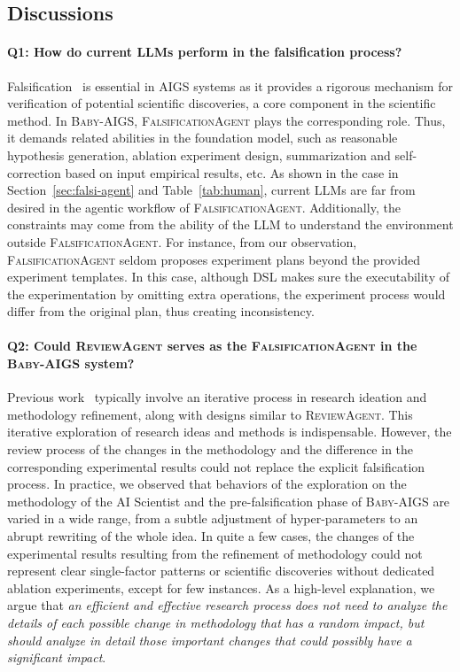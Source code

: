 \documentclass{article} %
\newcommand{\AIGS}{AIGS\xspace}
\newcommand{\AIGSSys}{\textsc{Baby-AIGS}\xspace}
\newcommand{\ReviewAgent}{\textsc{ReviewAgent}\xspace}
\newcommand{\FalsificationAgent}{\textsc{FalsificationAgent}\xspace}
\newcommand{\DSL}{\textsc{DSL}\xspace}
\begin{document}
\subsection{Discussions}\label{sec:exp-abl}

\paragraph{\textbf{Q1: How do current LLMs perform in the falsification process?}}

Falsification~\citep{Popper1935-POPTLO-7} is essential in \AIGS systems as it provides a rigorous mechanism for verification of potential scientific discoveries, a core component in the scientific method. In \AIGSSys, \FalsificationAgent plays the corresponding role. Thus, it demands related abilities in the foundation model, such as reasonable hypothesis generation, ablation experiment design, summarization and self-correction based on input empirical results, etc. As shown in the case in Section~\ref{sec:falsi-agent} and Table~\ref{tab:human}, current LLMs are far from desired in the agentic workflow of \FalsificationAgent. Additionally, the constraints may come from the ability of the LLM to understand the environment outside \FalsificationAgent. For instance, from our observation, \FalsificationAgent seldom proposes experiment plans beyond the provided experiment templates. In this case, although \DSL makes sure the executability of the experimentation by omitting extra operations, the experiment process would differ from the original plan, thus creating inconsistency. 


\paragraph{\textbf{Q2: Could \ReviewAgent serves as the \FalsificationAgent in the \AIGSSys system?}}

Previous work~\citep{lu2024aiscientist, su2024two, weng2024cycleresearcherimprovingautomatedresearch} typically involve an iterative process in research ideation and methodology refinement, along with designs similar to \ReviewAgent. This iterative exploration of research ideas and methods is indispensable. However, the review process of the changes in the methodology and the difference in the corresponding experimental results could not replace the explicit falsification process. In practice, we observed that behaviors of the exploration on the methodology of the AI Scientist and the pre-falsification phase of \AIGSSys are varied in a wide range, from a subtle adjustment of hyper-parameters to an abrupt rewriting of the whole idea. In quite a few cases, the changes of the experimental results resulting from the refinement of methodology could not represent clear single-factor patterns or scientific discoveries without dedicated ablation experiments, except for few instances. As a high-level explanation, we argue that \textit{an efficient and effective research process does not need to analyze the details of each possible change in methodology that has a random impact, but should analyze in detail those important changes that could possibly have a significant impact}. 
\end{document}
